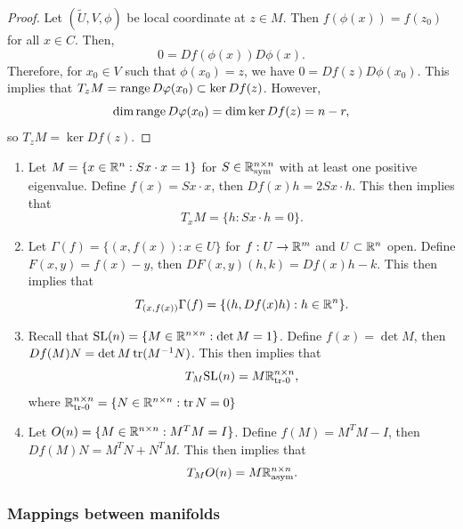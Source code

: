 \documentclass[a4paper]{article}
\begin{document}
\begin{proof}
  Let $(\tilde{U}, V, \phi)$ be local coordinate at $z \in M$. Then
  $f(\phi(x)) = f(z_0)$ for all $x \in C$. Then,
  \[
    0 = Df(\phi(x)) D\phi(x).
  \]
  Therefore, for $x_0 \in V$ such that $\phi(x_0) = z$, we have $0 = Df(z)
  D\phi(x_0)$. This implies that $T_z M = \operatorname{range} D\varphi(x_0) \subset \ker
  Df(z)$. However,
  \[
    \dim \operatorname{range} D\varphi(x_0) = \dim \ker Df(z) = n - r,
  \]
  so $T_z M = \ker Df(z)$.
\end{proof}

\begin{eg}
  \begin{enumerate}
    \item Let $M = \{x \in \mathbb{R}^n : S x \cdot x = 1\}$ for $S \in \mathbb{R}^{n
          \times n}_{\text{sym}}$ with at least one positive eigenvalue.
          Define $f(x) = Sx \cdot x$, then $Df(x) h = 2 Sx \cdot h$. This
          then implies that
          \[
            T_x M = \{h : Sx \cdot h = 0\}.
          \]

    \item Let $\Gamma(f) = \{(x, f(x)) : x \in U\}$ for $f : U \to \mathbb{R}^m$
          and $U \subset \mathbb{R}^n$ open. Define $F(x, y) = f(x) - y$, then
          $DF(x, y) (h, k) = Df(x) h - k$. This then implies that
          \[
            T_{(x, f(x))} \Gamma(f) = \{(h, Df(x) h) : h \in \mathbb{R}^n\}.
          \]

    \item Recall that $\mathrm{SL}(n) = \{M \in \mathbb{R}^{n \times n} : \det M = 1\}$.
          Define $f(x) = \det M$, then $Df(M) N = \det M \operatorname{tr} (M^{-1} N)$.
          This then implies that
          \[
            T_M \mathrm{SL}(n) = M \mathbb{R}^{n \times n}_{\text{tr-$0$}},
          \]
          where $\mathbb{R}^{n \times n}_{\text{tr-$0$}} = \{N \in \mathbb{R}^{n \times
          n}: \operatorname{tr} N = 0\}$

    \item Let $O(n) = \{M \in \mathbb{R}^{n \times n} : M^T M = I\}$. Define $f(M)
          = M^T M - I$, then $Df(M) N = M^T N + N^T M$. This then implies
          that
          \[
            T_M O(n) = M \mathbb{R}^{n \times n}_{\text{asym}}.
          \]
  \end{enumerate}
\end{eg}

\subsubsection{Mappings between manifolds}
\end{document}

